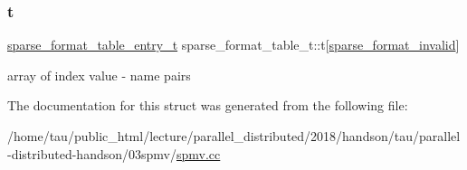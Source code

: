 \subsubsection{\texorpdfstring{t}{t}}
{\footnotesize\ttfamily \hyperlink{structsparse__format__table__entry__t}{sparse\+\_\+format\+\_\+table\+\_\+entry\+\_\+t} sparse\+\_\+format\+\_\+table\+\_\+t\+::t\mbox{[}\hyperlink{spmv_8cc_a8c0094893526c01b430903b2d9227256adc326179d0d559f82edc8cd35be11de5}{sparse\+\_\+format\+\_\+invalid}\mbox{]}}

array of index value -\/ name pairs 

The documentation for this struct was generated from the following file\+:\begin{DoxyCompactItemize}
\item 
/home/tau/public\+\_\+html/lecture/parallel\+\_\+distributed/2018/handson/tau/parallel-\/distributed-\/handson/03spmv/\hyperlink{spmv_8cc}{spmv.\+cc}\end{DoxyCompactItemize}
